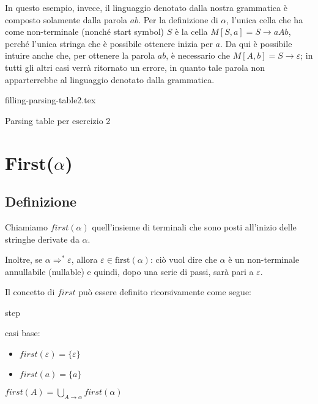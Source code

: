 \documentclass[class=book, crop=false, oneside, 12pt]{standalone}
\begin{document}
In questo esempio, invece, il linguaggio denotato dalla nostra grammatica è composto solamente dalla parola \(ab\). Per la definizione di \(\alpha\), l'unica cella che ha come non-terminale (nonché start symbol) \(S\) è la cella \(M[S, a] = S \rightarrow aAb\), perché l'unica stringa che è possibile ottenere inizia per \(a\). Da qui è possibile intuire anche che, per ottenere la parola \(ab\), è necessario che \(M[A, b] = S \rightarrow \varepsilon\); in tutti gli altri casi verrà ritornato un errore, in quanto tale parola non apparterrebbe al linguaggio denotato dalla grammatica. 

\begin{table}[H]
	\centering
	{filling-parsing-table2.tex}
    \caption{Parsing table per esercizio 2}
    \label{filling-parsing-table2}
\end{table}

\section{First(\(\alpha\))}
\subsection{Definizione}
\begin{definition}
    Chiamiamo \(first(\alpha)\) quell'insieme di terminali che sono posti all'inizio delle stringhe derivate da \(\alpha\).
    
    Inoltre, se \(\alpha \Rightarrow^* \varepsilon\), allora \(\varepsilon \in \textrm{first}(\alpha)\): ciò vuol dire che \(\alpha\) è un non-terminale annullabile (nullable) e quindi, dopo una serie di passi, sarà pari a \(\varepsilon\).
\end{definition}

Il concetto di \(first\) può essere definito ricorsivamente come segue:

\begin{labeling}{step}
    \item[Base] casi base:
    \begin{itemize}
        \item \(first(\varepsilon) = \{\varepsilon\}\)
        \item \(first(a) = \{a\}\)
    \end{itemize}
    \item[Step] \(first(A) = \bigcup_{A \rightarrow \alpha} first(\alpha)\)
\end{labeling}
\end{document}
